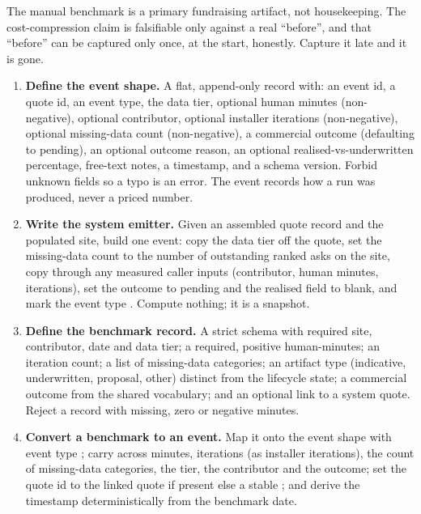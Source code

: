 \begin{keyidea}
The manual benchmark is a primary fundraising artifact, not housekeeping. The cost-compression claim is falsifiable only against a real ``before'', and that ``before'' can be captured only once, at the start, honestly. Capture it late and it is gone.
\end{keyidea}

\begin{rebuild}
\begin{enumerate}
  \item \textbf{Define the event shape.} A flat, append-only record with: an event id, a quote id, an event type, the data tier, optional human minutes (non-negative), optional contributor, optional installer iterations (non-negative), optional missing-data count (non-negative), a commercial outcome (defaulting to pending), an optional outcome reason, an optional realised-vs-underwritten percentage, free-text notes, a timestamp, and a schema version. Forbid unknown fields so a typo is an error. The event records how a run was produced, never a priced number.
  \item \textbf{Write the system emitter.} Given an assembled quote record and the populated site, build one event: copy the data tier off the quote, set the missing-data count to the number of outstanding ranked asks on the site, copy through any measured caller inputs (contributor, human minutes, iterations), set the outcome to pending and the realised field to blank, and mark the event type . Compute nothing; it is a snapshot.
  \item \textbf{Define the benchmark record.} A strict schema with required site, contributor, date and data tier; a required, positive human-minutes; an iteration count; a list of missing-data categories; an artifact type (indicative, underwritten, proposal, other) distinct from the lifecycle state; a commercial outcome from the shared vocabulary; and an optional link to a system quote. Reject a record with missing, zero or negative minutes.
  \item \textbf{Convert a benchmark to an event.} Map it onto the event shape with event type ; carry across minutes, iterations (as installer iterations), the count of missing-data categories, the tier, the contributor and the outcome; set the quote id to the linked quote if present else a stable ; and derive the timestamp deterministically from the benchmark date.

\end{enumerate}
\end{rebuild}
